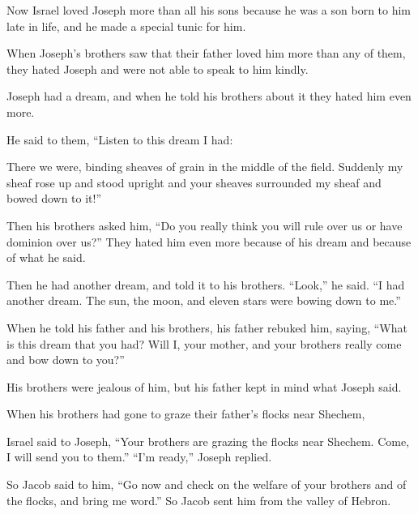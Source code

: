 \begin{scripture}
 Now Israel loved Joseph more than all his sons because he was a son born to him late in life, and he made a special tunic for him.
 When Joseph's brothers saw that their father loved him more than any of them, they hated Joseph and were not able to speak to him kindly.
\everypar{}

 Joseph had a dream, and when he told his brothers about it they hated him even more.
 He said to them, ``Listen to this dream I had:
 There we were, binding sheaves of grain in the middle of the field. Suddenly my sheaf rose up and stood upright and your sheaves surrounded my sheaf and bowed down to it!''
 Then his brothers asked him, ``Do you really think you will rule over us or have dominion over us?'' They hated him even more because of his dream and because of what he said.
\everypar{}

 Then he had another dream, and told it to his brothers. ``Look,'' he said. ``I had another dream. The sun, the moon, and eleven stars were bowing down to me.''
 When he told his father and his brothers, his father rebuked him, saying, ``What is this dream that you had? Will I, your mother, and your brothers really come and bow down to you?''
 His brothers were jealous of him, but his father kept in mind what Joseph said.
\everypar{}

 When his brothers had gone to graze their father's flocks near Shechem,
 Israel said to Joseph, ``Your brothers are grazing the flocks near Shechem. Come, I will send you to them.'' ``I'm ready,'' Joseph replied.
 So Jacob said to him, ``Go now and check on the welfare of your brothers and of the flocks, and bring me word.'' So Jacob sent him from the valley of Hebron.
\everypar{}


\end{scripture}
